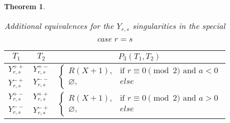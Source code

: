 \documentclass[noend]{amsproc}
\newtheorem{theorem}{Theorem}
\theoremstyle{definition}
\begin{document}
\begin{theorem}
\begin{table}[htbp]
\centering
\caption{Additional equivalences for the $Y_{r,s}$ singularities in the
special case $r = s$}
\label{tab:Yrr_equivalences}
\begin{tabular}{|c|c||c|}
\hline

$T_1$ & $T_2$ & $P_3(T_1, T_2)$ \\
\hline\hline

$Y_{r,s}^{++}$ & $Y_{r,s}^{+-}$ &
\multirow{2}{*}{$\begin{cases}
  R(X+1),      &\!\text{if } r \equiv 0 \pmod{2} \text{ and } a < 0 \\
  \varnothing, &else
\end{cases}$}
\\ \cline{1-2}

$Y_{r,s}^{-+}$ & $Y_{r,s}^{--}$ &
\\ \hline

$Y_{r,s}^{+-}$ & $Y_{r,s}^{++}$ &
\multirow{2}{*}{$\begin{cases}
  R(X+1),      &\!\text{if } r \equiv 0 \pmod{2} \text{ and } a > 0 \\
  \varnothing, &else
\end{cases}$}
\\ \cline{1-2}

$Y_{r,s}^{--}$ & $Y_{r,s}^{-+}$ &
\\ \hline

\end{tabular}
\end{table}

\end{theorem}
\end{document}
